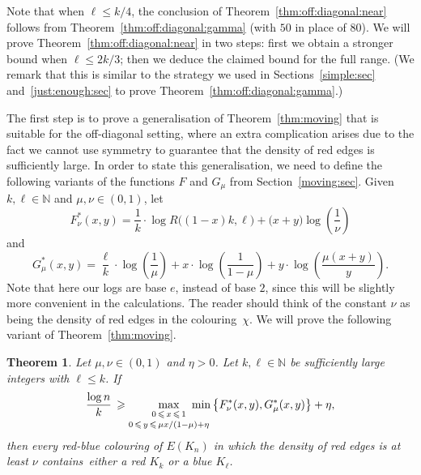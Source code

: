 \documentclass[12pt,reqno]{amsart}
\newtheorem{theorem}{Theorem}[section]
\theoremstyle{definition}
\theoremstyle{remark}
\newcommand\N{\mathbb{N}}
\renewcommand{\le}{\leqslant}
\renewcommand{\ge}{\geqslant}
\def\N{\mathbb{N}}
\begin{document}
Note that when $\ell \le k/4$, the conclusion of Theorem~\ref{thm:off:diagonal:near} follows from Theorem~\ref{thm:off:diagonal:gamma} (with $50$ in place of $80$). We will prove Theorem~\ref{thm:off:diagonal:near} in two steps: first we obtain a stronger bound when $\ell \le 2k/3$; then we deduce the claimed bound for the full range. (We remark that this is similar to the strategy we used in Sections~\ref{simple:sec} and~\ref{just:enough:sec} to prove Theorem~\ref{thm:off:diagonal:gamma}.)

The first step is to prove a generalisation of Theorem~\ref{thm:moving} that is suitable for the off-diagonal setting, where an extra complication arises due to the fact we cannot use symmetry to guarantee that the density of red edges is sufficiently large. In order to state this generalisation, we need to define the following variants of the functions $F$ and $G_\mu$ from Section~\ref{moving:sec}. Given $k,\ell \in \N$ and $\mu, \nu \in (0,1)$, let 
\begin{equation}\label{def:Fstar}
F^*_\nu(x,y) = \frac{1}{k} \cdot \log R\big( (1-x)k,\ell \big)+ \big( x + y \big) \log \left( \frac{1}{\nu} \right)
\end{equation}
and 
\begin{equation}\label{def:Gstar}
G^*_\mu(x,y) = \frac{\ell}{k} \cdot \log \left( \frac{1}{\mu} \right) + x \cdot \log \left(\frac{1}{1 - \mu} \right) + y \cdot \log \left(\frac{\mu(x+y)}{y}\right).
\end{equation}
Note that here our logs are base $e$, instead of base $2$, since this will be slightly more convenient in the calculations. The reader should think of the constant $\nu$ as being the density of red edges in the colouring~$\chi$. We will prove the following variant of Theorem~\ref{thm:moving}.


\begin{theorem}\label{thm:generalbound}
Let\/ $\mu, \nu \in (0,1)$ and\/ $\eta > 0$. Let\/ $k,\ell\in \N$ be sufficiently large integers with\/ $\ell \le k$. If %
$$\frac{\log n}{k} \, \ge \max_{\substack{\\[-0.05ex] 0 \,\le\, x \,\le\, 1 \\[+0.3ex] 0 \,\le\, y \,\le\, \mu x/(1-\mu)+\eta}} \hspace{-0.6cm} \min \big\{ F^*_\nu (x,y),G^*_\mu(x,y) \big\} + \eta,$$ 
then every red-blue colouring of $E(K_n)$ in which the density of red edges is at least\/ $\nu$ contains~either a red\/ $K_k$ or a blue\/ $K_\ell$. 
\end{theorem}
 
\end{document}
